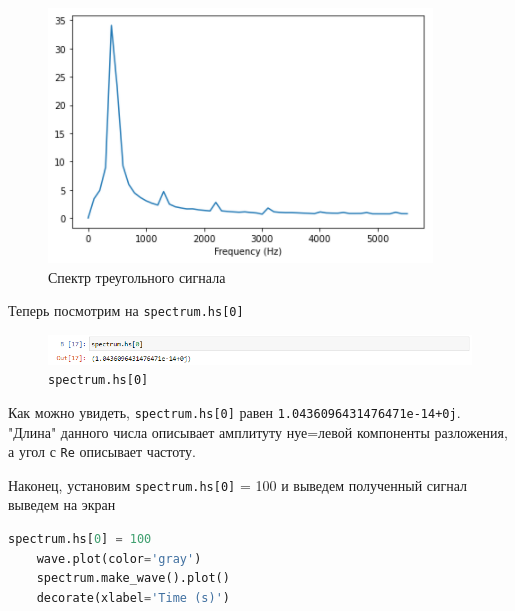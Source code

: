 \documentclass[a4paper]{article}
\begin{document}
            \begin{figure}[H]
                \centering
                \includegraphics[width=\textwidth]{ex_4_triangle_signal_spectr.png}
                \caption{Спектр треугольного сигнала}
                \label{fig:ex_4_triangle_signal_spectr}
            \end{figure}
            
            Теперь посмотрим на \texttt{spectrum.hs[0]}
            
            \begin{figure}[H]
                \centering
                \includegraphics[width=\textwidth]{ex_4_spectrum_hs.png}
                \caption{\texttt{spectrum.hs[0]}}
                \label{fig:ex_4_spectrum_hs}
            \end{figure}
            
            Как можно увидеть, \texttt{spectrum.hs[0]} равен \texttt{1.0436096431476471e-14+0j}. "Длина" данного числа описывает амплитуту нуе=левой компоненты разложения, а угол с \texttt{Re} описывает частоту.
            
            Наконец, установим \texttt{spectrum.hs[0]} = 100 и выведем полученный сигнал выведем на экран
            
\begin{lstlisting}[language=Python, caption= \texttt{spectrum.hs[0]} = 100]
    spectrum.hs[0] = 100
    wave.plot(color='gray')
    spectrum.make_wave().plot()
    decorate(xlabel='Time (s)')
\end{lstlisting}               
            
\end{document}
